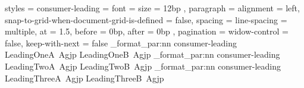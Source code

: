 
\mainmatter
\ExplSyntaxOn
\docxlikesetup
  {
    styles =
      {
        consumer-leading =
          {
            font = { size = 12bp },
            paragraph =
              {
                alignment = left,
                snap-to-grid-when-document-grid-is-defined = false,
                spacing = { line-spacing = multiple, at = 1.5, before = 0bp, after = 0bp },
                pagination = { widow-control = false, keep-with-next = false }
              }
          }
      }
  }
\docxlike_format_par:nn { consumer-leading } { LeadingOneA~Agjp \break LeadingOneB~Agjp }
\docxlike_format_par:nn { consumer-leading } { LeadingTwoA~Agjp \break LeadingTwoB~Agjp }
\docxlike_format_par:nn { consumer-leading } { LeadingThreeA~Agjp \break LeadingThreeB~Agjp }
\ExplSyntaxOff

